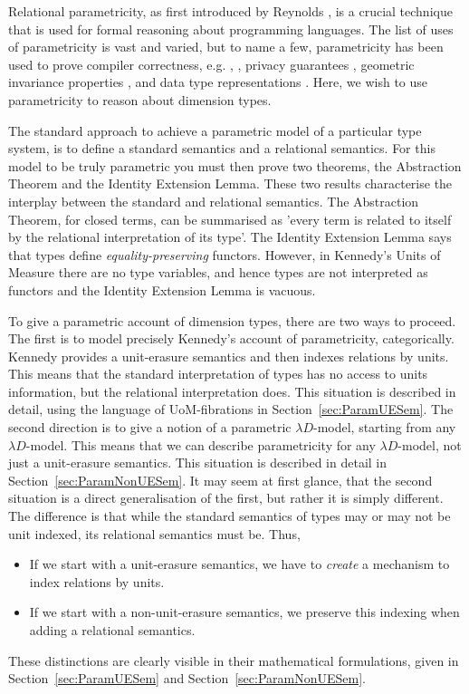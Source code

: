 \documentclass[a4paper,UKenglish]{lipics}
\newcommand{\UoM}{Units of Measure\xspace}
\begin{document}
Relational parametricity, as first introduced by Reynolds \cite{reynolds1983types} , is a crucial technique that is used for formal reasoning about programming languages. The list of uses of parametricity is vast and varied, but to name a few, parametricity has been used to prove compiler correctness, e.g. \cite{benton2009biorthogonality}, \cite{ahmed2008typed}, privacy guarantees \cite{reed2010distance}, geometric invariance properties \cite{atkey2013abstraction}, and data type representations \cite{hasegawa1994categorical}. Here, we wish to use parametricity to reason about dimension types.

The standard approach to achieve a parametric model of a particular type system, is to define a standard semantics and a relational semantics. For this model to be truly parametric you must then prove two theorems, the Abstraction Theorem and the Identity Extension Lemma. These two results characterise the interplay between the standard and relational semantics. The Abstraction Theorem, for closed terms, can be summarised as 'every term is related to itself by the relational interpretation of its type'. The Identity Extension Lemma says that types define \emph{equality-preserving} functors. However, in Kennedy's \UoM there are no type variables, and hence types are not  interpreted as functors and the Identity Extension Lemma is vacuous.

To give a parametric account of dimension types, there are two ways to proceed. The first is to model precisely Kennedy's account of parametricity, categorically. Kennedy provides a unit-erasure semantics and then indexes relations by units. This means that the standard interpretation of types has no access to units information, but the relational interpretation does. This situation is described in detail, using the language of UoM-fibrations in Section~\ref{sec:ParamUESem}. The second direction is to give a notion of a parametric $\lambda D$-model, starting from any $\lambda D$-model. This means that we can describe parametricity for any $\lambda D$-model, not just a unit-erasure semantics. This situation is described in detail in Section~\ref{sec:ParamNonUESem}. It may seem at first glance, that the second situation is a direct generalisation of the first, but rather it is simply different. The difference is that while the standard semantics of types may or may not be unit indexed, its relational semantics
must be. Thus,
\begin{itemize}
 \item If we start with a unit-erasure semantics, we have to \emph{create} a mechanism to index relations by units.
 \item If we start with a non-unit-erasure semantics, we preserve this indexing when adding a relational semantics.
\end{itemize}
These distinctions are clearly visible in their mathematical formulations, given in Section~\ref{sec:ParamUESem} and Section~\ref{sec:ParamNonUESem}.
\end{document}
